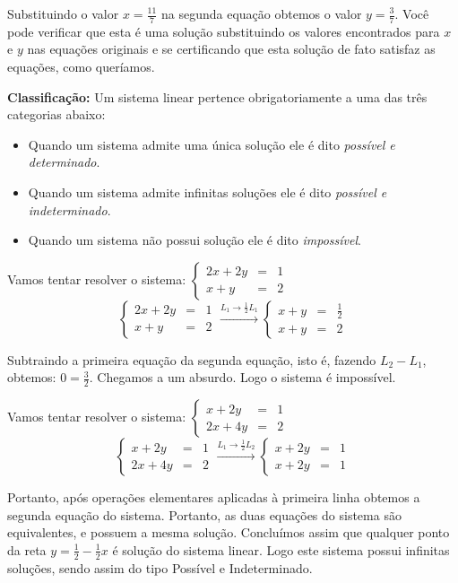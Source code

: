 \noindent Substituindo o valor $x=\frac{11}{7}$ na segunda equação obtemos o valor $y=\frac{3}{7}$. Você pode verificar que esta é uma solução
substituindo os valores encontrados para $x$ e $y$ nas equações originais e se certificando que esta solução de fato satisfaz as equações,
como queríamos.

\noindent\textbf{Classificação:} Um sistema linear pertence obrigatoriamente a uma das três categorias abaixo:
\begin{mybox} \begin{itemize}
\item Quando um sistema admite uma única solução ele é dito \textit{possível e determinado}.
\item Quando um sistema admite infinitas soluções ele é dito \textit{possível e indeterminado}.
\item Quando um sistema não possui solução ele é dito \textit{impossível}.
\end{itemize}
\end{mybox}

\begin{exemplo} Vamos tentar resolver o sistema: $\left\{ \begin{array}{rcl}
2x+2y&=&1\\
x+y&=&2
\end{array}\right.$
\smallskip{}
\[
\left\{ \begin{array}{rcl}
2x+2y&=&1\\
x+y&=&2
\end{array}\right. \xrightarrow[]{L_1\rightarrow \frac{1}{2}L_1}\left\{ \begin{array}{rcl}
x+y&=&\frac{1}{2}\\
x+y&=&2
\end{array}\right.
\]

Subtraindo a primeira equação da segunda equação, isto é, fazendo $L_2-L_1$, obtemos: $0=\frac{3}{2}$.
Chegamos a um absurdo. Logo o sistema é impossível.
\end{exemplo}


\begin{exemplo} Vamos tentar resolver o sistema: $\left\{ \begin{array}{rcl}
x+2y&=&1\\
2x+4y&=&2
\end{array}\right.$
\smallskip{}
\[
\left\{ \begin{array}{rcl}
x+2y&=&1\\
2x+4y&=&2
\end{array}\right. \xrightarrow[]{L_1\rightarrow \frac{1}{2}L_2}\left\{ \begin{array}{rcl}
x+2y&=&1\\
x+2y&=&1
\end{array}\right.
\]

Portanto, após operações elementares aplicadas à primeira linha obtemos a segunda equação do sistema. Portanto, as duas
equações do sistema são equivalentes, e possuem a mesma solução. Concluímos assim que qualquer ponto da reta $y=\frac{1}{2}-\frac{1}{2}x$
é solução do sistema linear. Logo este sistema possui infinitas soluções, sendo assim do tipo Possível e Indeterminado.
\end{exemplo}

